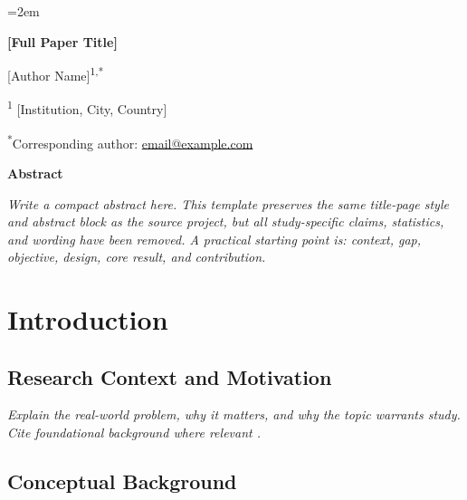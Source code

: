\documentclass[12pt,a4paper]{article}
\makeatletter
\newcommand{\papertitle}{[Full Paper Title]}
\newcommand{\paperauthor}{[Author Name]}
\newcommand{\paperaffiliation}{[Institution, City, Country]}
\newcommand{\paperemail}{email@example.com}
\newcommand{\placeholder}[1]{\textit{#1}}
\makeatother
\begin{document}
\emergencystretch=2em

\begin{titlepage}
\thispagestyle{titlepagestyle}
\vspace*{1.4cm}
\begin{center}
{\fontsize{18}{22}\selectfont\bfseries \papertitle\par}
\vspace{1.8cm}
{\large \paperauthor\textsuperscript{1,*}\par}
\vspace{0.30cm}
{\normalsize \textsuperscript{1} \paperaffiliation\par}
\vspace{0.15cm}
{\normalsize \textsuperscript{*}Corresponding author: \href{mailto:\paperemail}{\paperemail}\par}
\end{center}
\vspace{1.0cm}
\begin{center}
\textbf{Abstract}
\end{center}
\begin{center}
\begin{minipage}{0.92\textwidth}
\placeholder{Write a compact abstract here. This template preserves the same title-page style and abstract block as the source project, but all study-specific claims, statistics, and wording have been removed. A practical starting point is: context, gap, objective, design, core result, and contribution.}
\end{minipage}
\end{center}
\end{titlepage}

\clearpage
\setcounter{page}{1}

\section{Introduction}

\subsection{Research Context and Motivation}

\placeholder{Explain the real-world problem, why it matters, and why the topic warrants study. Cite foundational background where relevant \citep{placeholder_background}.}

\subsection{Conceptual Background}
\end{document}
